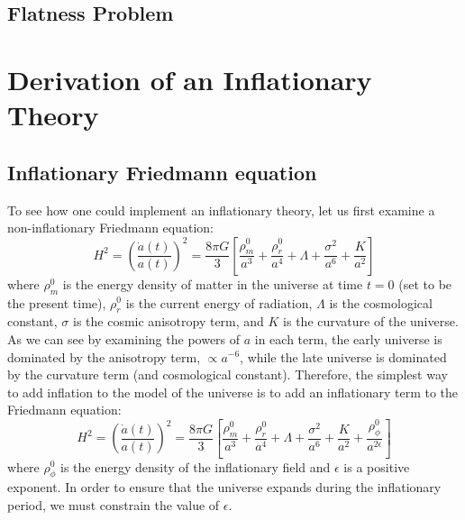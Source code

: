 \documentclass[onecolumn,apj]{emulateapj}
\newcommand{\mep}[1]{{\color{applegreen} \textbf{[MEP:  #1]}}}
\begin{document}
\subsection{Flatness Problem}
\label{ssec:Flatness}

\section{Derivation of an Inflationary Theory}
\subsection{Inflationary Friedmann equation}
\label{ssec:InflationaryFriedmann}
To see how one could implement an inflationary theory, let us first examine a non-inflationary Friedmann equation:
\begin{equation}
H^2 = \left ( \frac{\dot a(t)}{a(t)} \right ) ^2 = \frac{8 \pi G}{3} \left [ \frac{\rho^0_m}{a^3} + \frac{\rho^0_r}{a^4} + \Lambda + \frac{\sigma^2}{a^6} + \frac{K}{a^2} \right ]
\end{equation}
where $\rho^0_m$ is the energy density of matter in the universe at time $t=0$ (set to be the present time), $\rho^0_r$ is the current energy of radiation, $\Lambda$ is the cosmological constant, $\sigma$ is the cosmic anisotropy term, and $K$ is the curvature of the universe. As we can see by examining the powers of $a$ in each term, the early universe is dominated by the anisotropy term, $\propto a^{-6}$, while the late universe is dominated by the curvature term (and cosmological constant). Therefore, the simplest way to add inflation to the model of the universe is to add an inflationary term to the Friedmann equation: 
\begin{equation}
H^2 = \left ( \frac{\dot a(t)}{a(t)} \right ) ^2 = \frac{8 \pi G}{3} \left [ \frac{\rho^0_m}{a^3} + \frac{\rho^0_r}{a^4} + \Lambda + \frac{\sigma^2}{a^6} + \frac{K}{a^2} + \frac{\rho^0_\phi}{a^{2\epsilon}} \right ]
\end{equation}
where $\rho^0_\phi$ is the energy density of the inflationary field and $\epsilon$ is a positive exponent. In order to ensure that the universe expands during the inflationary period, we must constrain the value of $\epsilon$. 
\end{document}
